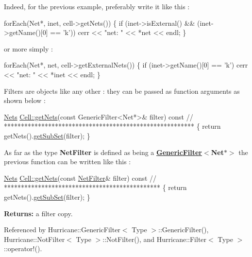 Indeed, for the previous example, preferably write it like this \+: 
\begin{DoxyCode}
forEach(Net*, inet, cell->getNets()) \{
   \textcolor{keywordflow}{if} (inet->isExternal() && (inet->getName()[0] == \textcolor{charliteral}{'k'}))
      cerr << \textcolor{stringliteral}{"net: "} << *net << endl;
\}
\end{DoxyCode}
 or more simply \+: 
\begin{DoxyCode}
forEach(Net*, net, cell->getExternalNets()) \{
   \textcolor{keywordflow}{if} (inet->getName()[0] == \textcolor{charliteral}{'k'})
      cerr << \textcolor{stringliteral}{"net: "} << *inet << endl;
\}
\end{DoxyCode}
 Filters are objects like any other \+: they can be passed as function arguments as shown below \+: 
\begin{DoxyCode}
\hyperlink{namespaceHurricane_a3404a8b17130a1824f4a281704b04df7}{Nets} \hyperlink{classHurricane_1_1Cell_a8b4728abe83e9ec21d7bee1154218279}{Cell::getNets}(\textcolor{keyword}{const} GenericFilter<Net*>& filter) \textcolor{keyword}{const}
\textcolor{comment}{// ********************************************************}
\{
   \textcolor{keywordflow}{return} getNets().\hyperlink{classHurricane_1_1Collection_aa32ea7249d57ee05e3c71dcde8106832}{getSubSet}(filter);
\}
\end{DoxyCode}
 As far as the type {\bfseries Net\+Filter} is defined as being a {\bfseries \hyperlink{classHurricane_1_1GenericFilter}{Generic\+Filter}$<$Net$\ast$$>$} the previous function can be written like this \+: 
\begin{DoxyCode}
\hyperlink{namespaceHurricane_a3404a8b17130a1824f4a281704b04df7}{Nets} \hyperlink{classHurricane_1_1Cell_a8b4728abe83e9ec21d7bee1154218279}{Cell::getNets}(\textcolor{keyword}{const} \hyperlink{namespaceHurricane_a0dfd2c5b40325a919d139091312732e9}{NetFilter}& filter) \textcolor{keyword}{const}
\textcolor{comment}{// **********************************************}
\{
   \textcolor{keywordflow}{return} getNets().\hyperlink{classHurricane_1_1Collection_aa32ea7249d57ee05e3c71dcde8106832}{getSubSet}(filter);
\}
\end{DoxyCode}


{\bfseries Returns\+:} a filter copy. 

Referenced by Hurricane\+::\+Generic\+Filter$<$ Type $>$\+::\+Generic\+Filter(), Hurricane\+::\+Not\+Filter$<$ Type $>$\+::\+Not\+Filter(), and Hurricane\+::\+Filter$<$ Type $>$\+::operator!().

\mbox{\label{classHurricane_1_1Filter_aeaa771f17950fe05273c471ccfffb7f7}} 
